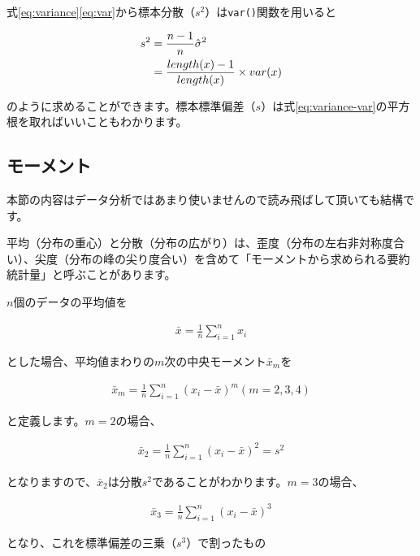 \documentclass[
  12pt,
]{book}
\begin{document}
式\eqref{eq:variance}\eqref{eq:var}から標本分散（\(s^2\)）は\texttt{var()}関数を用いると

\begin{align}
  s^2 &= \frac{n - 1}{n}\hat{\sigma}^2 \label{eq:variance-var} \\
  &= \frac{length(x) - 1}{length(x)} \times var(x) \notag
\end{align}

のように求めることができます。標本標準偏差（\(s\)）は式\eqref{eq:variance-var}の平方根を取ればいいこともわかります。

\hypertarget{ux30e2ux30fcux30e1ux30f3ux30c8}{%
\subsection{モーメント}\label{ux30e2ux30fcux30e1ux30f3ux30c8}}

本節の内容はデータ分析ではあまり使いませんので読み飛ばして頂いても結構です。

平均（分布の重心）と分散（分布の広がり）は、歪度（分布の左右非対称度合い）、尖度（分布の峰の尖り度合い）を含めて「モーメントから求められる要約統計量」と呼ぶことがあります。

\(n\)個のデータの平均値を

\begin{align}
  \bar{x} = \frac{1}{n}\sum_{i = 1}^{n}x_i \label{eq:moment1}
\end{align}

とした場合、平均値まわりの\(m\)次の中央モーメント\(\bar{x}_m\)を

\begin{align}
  \bar{x}_m = \frac{1}{n}\sum_{i = 1}^{n}(x_i - \bar{x})^m　　(m = 2, 3, 4) \label{eq:moment}
\end{align}

と定義します。\(m = 2\)の場合、

\begin{align}
  \bar{x}_2 = \frac{1}{n}\sum_{i = 1}^{n}(x_i - \bar{x})^2 = s^2 \label{eq:moment2}
\end{align}

となりますので、\(\bar{x}_2\)は分散\(s^2\)であることがわかります。\(m = 3\)の場合、

\begin{align}
  \bar{x}_3 = \frac{1}{n}\sum_{i = 1}^{n}(x_i - \bar{x})^3 \label{eq:moment3}
\end{align}

となり、これを標準偏差の三乗（\(s^3\)）で割ったもの
\end{document}
